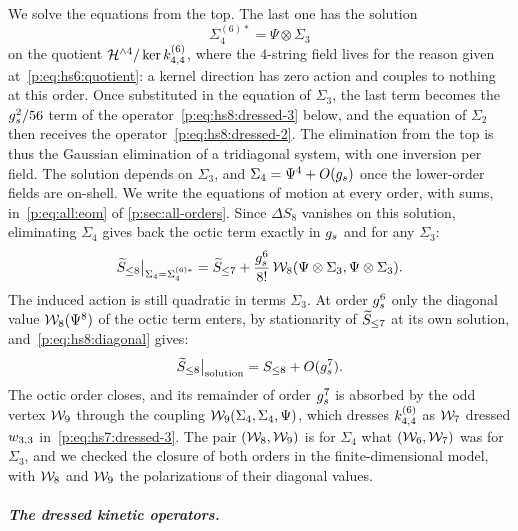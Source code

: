 We solve the equations from the top.
  The last one has the solution
  \begin{equation}
  \label{p:eq:hs8:solution-4}
  \Sigma_4^{(6)*}
    = \Psi \otimes \Sigma_3
\end{equation}
  on the quotient $\Hn{4} / \ker \kin{4}{}{6}$, where the $4$-string field lives for the reason given at~\eqref{p:eq:hs6:quotient}: a kernel direction has zero action and couples to nothing at this order.
  Once substituted in the equation of $\Sigma_3$, the last term becomes the $\gs^2 / 56$ term of the operator~\eqref{p:eq:hs8:dressed-3} below, and the equation of $\Sigma_2$ then receives the operator~\eqref{p:eq:hs8:dressed-2}.
  The elimination from the top is thus the Gaussian elimination of a tridiagonal system, with one inversion per field.
  The solution depends on $\Sigma_3$, and $\Sigma_4 = \Psi^4 + O(\gs)$ once the lower-order fields are on-shell.
  We write the equations of motion at every order, with sums, in~\eqref{p:eq:all:eom} of \cref{p:sec:all-orders}.
Since $\Delta S_8$ vanishes on this solution, eliminating $\Sigma_4$ gives back the octic term exactly in $\gs$ and for any $\Sigma_3$:
\begin{equation}
\caction[\le 8] \big|_{\Sigma_4 = \Sigma_4^{(6)*}}
  = \caction[\le 7]
    + \frac{\gs^6}{8!} \, \dvertex{8}(\Psi \otimes \Sigma_3, \Psi \otimes \Sigma_3).
\end{equation}
The induced action is still quadratic in terms $\Sigma_3$.
At order $\gs^6$ only the diagonal value $\dvertex{8}(\Psi^8)$ of the octic term enters, by stationarity of $\caction[\le 7]$ at its own solution, and~\eqref{p:eq:hs8:diagonal} gives:
\begin{equation}
  \label{p:eq:hs8:eliminate}
  \caction[\le 8] \big|_{\text{solution}}
    = S_{\le 8} + O(\gs^7).
\end{equation}
The octic order closes, and its remainder of order $\gs^7$ is absorbed by the odd vertex $\dvertex{9}$ through the coupling $\dvertex{9}(\Sigma_4, \Sigma_4, \Psi)$, which dresses $\kin{4}{}{6}$ as $\dvertex{7}$ dressed $\wprod{3}{3}$ in~\eqref{p:eq:hs7:dressed-3}.
The pair $(\dvertex{8}, \dvertex{9})$ is for $\Sigma_4$ what $(\dvertex{6}, \dvertex{7})$ was for $\Sigma_3$, and we checked the closure of both orders in the finite-dimensional model, with $\dvertex{8}$ and $\dvertex{9}$ the polarizations of their diagonal values.

\subparagraph{The dressed kinetic operators.}

